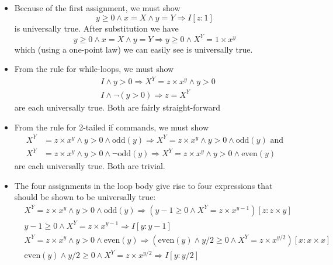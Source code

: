 \documentclass[11pt]{article}%
\begin{document}
\begin{itemize}
\item Because of the first assignment, we must show%
\[
y\geq0\wedge x=X\wedge y=Y\Rightarrow I[z:1]
\]
is universally true. After substitution we have%
\[
y\geq0\wedge x=X\wedge y=Y\Rightarrow y\geq0\wedge X^{Y}=1\times x^{y}%
\]
which (using a one-point law) we can easily see is universally true.

\item From the rule for while-loops, we must show%
\begin{align*}
&  I\wedge y>0\Rightarrow X^{Y}=z\times x^{y}\wedge y>0\\
&  I\wedge\lnot\left(  y>0\right)  \Rightarrow z=X^{Y}%
\end{align*}
are each universally true. Both are fairly straight-forward

\item From the rule for 2-tailed if commands, we must show%
\begin{align*}
X^{Y}  &  =z\times x^{y}\wedge y>0\wedge\mathrm{odd}(y)\Rightarrow
X^{Y}=z\times x^{y}\wedge y>0\wedge\mathrm{odd}(y)\text{ and}\\
X^{Y}  &  =z\times x^{y}\wedge y>0\wedge\lnot\mathrm{odd}(y)\Rightarrow
X^{Y}=z\times x^{y}\wedge y>0\wedge\mathrm{even}(y)
\end{align*}
are each universally true. Both are trivial.

\item The four assignments in the loop body give rise to four expressions that
should be shown to be universally true:%
\begin{align*}
&  \left.  X^{Y}=z\times x^{y}\wedge y>0\wedge\mathrm{odd}(y)\right.
\Rightarrow\left(  y-1\geq0\wedge X^{Y}=z\times x^{y-1}\right)  [z:z\times
y]\\
&  \left.  y-1\geq0\wedge X^{Y}=z\times x^{y-1}\right.  \Rightarrow I[y:y-1]\\
&  \left.  X^{Y}=z\times x^{y}\wedge y>0\wedge\mathrm{even}(y)\right.
\Rightarrow\left(  \mathrm{even}(y)\wedge y/2\geq0\wedge X^{Y}=z\times
x^{y/2}\right)  [x:x\times x]\\
&  \left.  \mathrm{even}(y)\wedge y/2\geq0\wedge X^{Y}=z\times x^{y/2}\right.
\Rightarrow I[y:y/2]
\end{align*}

\end{itemize}



\end{document}
